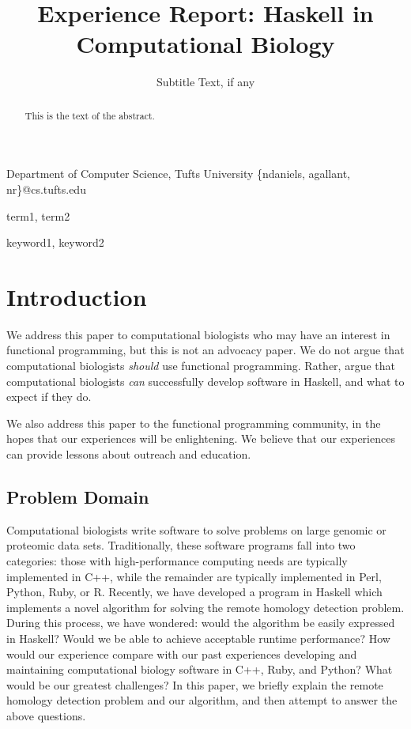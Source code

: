 \documentclass[preprint]{sigplanconf}
\begin{document}
\copyrightdata{[to be supplied]} 


\title{Experience Report: Haskell in Computational Biology}
\subtitle{Subtitle Text, if any}

           {Department of Computer Science, Tufts University}
           {\{ndaniels, agallant, nr\}@cs.tufts.edu}


\maketitle

\begin{abstract}
This is the text of the abstract.
\end{abstract}


\terms
term1, term2

\keywords
keyword1, keyword2

\section{Introduction}

We address this paper to computational biologists who may have an interest in 
functional programming, but this is not an advocacy paper. We do not argue that 
computational biologists \textit{should} use functional programming. Rather, 
argue that computational biologists \textit{can} successfully develop software 
in Haskell, and what to expect if they do.

We also address this paper to the functional programming community, in the 
hopes that our experiences will be enlightening. We believe that our 
experiences can provide lessons about outreach and education.


\subsection{Problem Domain}

Computational biologists write software to solve problems on large genomic or 
proteomic data sets. Traditionally, these software programs fall into two 
categories: those with high-performance computing needs are typically 
implemented in C++, while the remainder are typically implemented in Perl, 
Python, Ruby, or R. Recently, we have developed a program in Haskell which 
implements a novel algorithm for solving the remote homology detection problem. 
During this process, we have wondered: would the algorithm be easily expressed 
in Haskell? Would we be able to achieve acceptable runtime performance? How 
would our experience compare with our past experiences developing and 
maintaining computational biology software in C++, Ruby, and Python? What would 
be our greatest challenges? In this paper, we briefly explain the remote 
homology detection problem and our algorithm, and then attempt to answer the 
above questions.
\end{document}
